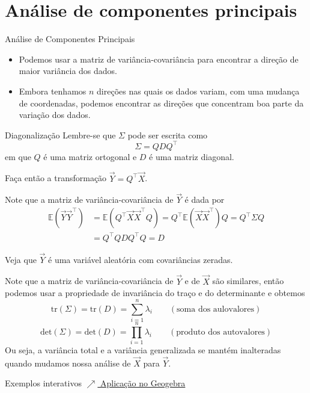 \documentclass[
  ignorenonframetext,
  aspectratio=169,
]{beamer}
\newcommand{\EE}{\mathbb{E}}
\newcommand{\vX}{\vec{X}}
\newcommand{\vY}{\vec{Y}}
\begin{document}
\section{Análise de componentes principais}


\begin{frame}{Análise de Componentes Principais}
  \begin{itemize}
    \item Podemos usar a matriz de variância-covariância para encontrar a direção de maior variância dos dados.
    \item Embora tenhamos $n$ direções nas quais os dados variam, com uma mudança de coordenadas, podemos encontrar as direções que concentram boa parte da variação dos dados.
  \end{itemize}
\end{frame}

\begin{frame}{Diagonalização}
  Lembre-se que $\Sigma$ pode ser escrita como
  \[\Sigma = QDQ^\top\]
  em que $Q$ é uma matriz ortogonal e $D$ é uma matriz diagonal.

  Faça então a transformação $\vY = Q^\top\vX$.
\end{frame}
\begin{frame}
  
  Note que a matriz de variância-covariância de $\vY$ é dada por 
  \begin{align*}
    \EE(\vY\vY^\top) &= \EE(Q^\top\vX\vX^\top Q) = Q^\top\EE(\vX\vX^\top)Q = Q^\top\Sigma Q \\
    &= Q^\top QDQ^\top Q = D
  \end{align*}

  Veja que $\vY$ é uma variável aleatória com covariâncias zeradas.  
  
\end{frame}

\begin{frame}
  Note que a matriz de variância-covariância de $\vY$ e de $\vX$ são similares, então podemos usar a propriedade de invariância do traço e do determinante e obtemos
  \[\text{tr}(\Sigma) = \text{tr}(D) = \sum_{i=1}^n \lambda_i \qquad (\text{soma dos aulovalores})\]
  \[\text{det}(\Sigma) = \text{det}(D) = \prod_{i=1}^n \lambda_i \qquad (\text{produto dos autovalores})\]
  Ou seja, a variância total e a variância generalizada se mantém inalteradas quando mudamos nossa análise de $\vX$ para $\vY$.
\end{frame}
 
\begin{frame}{Exemplos interativos}
  \href{https://www.geogebra.org/m/vsn2qpec}{$\nearrow$ Aplicação no Geogebra}
\end{frame}
%   
% 
\end{document}
